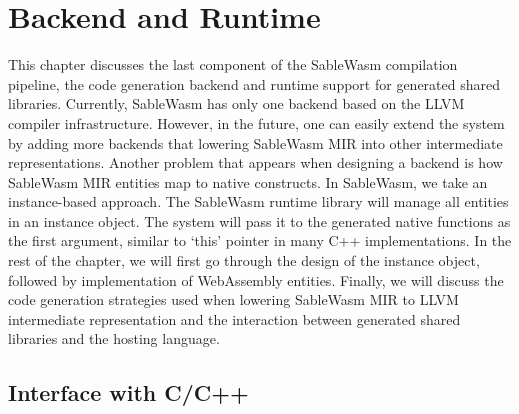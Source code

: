 \chapter{Backend and Runtime}

This chapter discusses the last component of the SableWasm compilation pipeline, the code generation backend and runtime support for generated shared libraries. Currently, SableWasm has only one backend based on the LLVM compiler infrastructure. However, in the future, one can easily extend the system by adding more backends that lowering SableWasm MIR into other intermediate representations. Another problem that appears when designing a backend is how SableWasm MIR entities map to native constructs. In SableWasm, we take an instance-based approach. The SableWasm runtime library will manage all entities in an instance object. The system will pass it to the generated native functions as the first argument, similar to `this' pointer in many C++ implementations. In the rest of the chapter, we will first go through the design of the instance object, followed by implementation of WebAssembly entities. Finally, we will discuss the code generation strategies used when lowering SableWasm MIR to LLVM intermediate representation and the interaction between generated shared libraries and the hosting language.





\section{Interface with C/C++}

